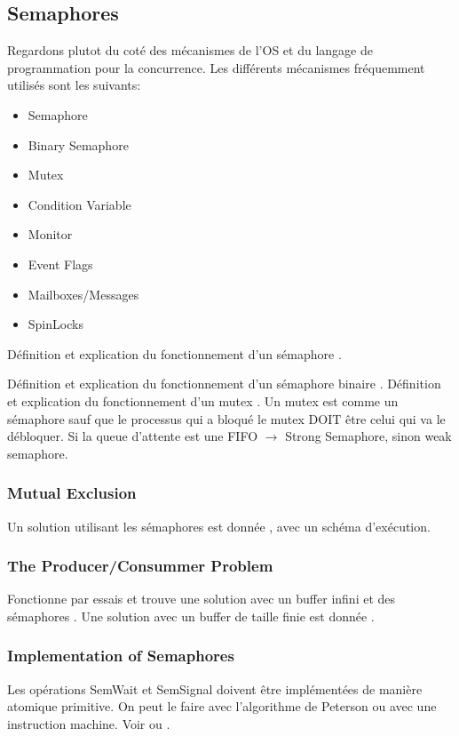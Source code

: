\subsection{Semaphores}
Regardons plutot du coté des mécanismes de l'OS et du langage de programmation pour la concurrence.
Les différents mécanismes fréquemment utilisés sont les suivants:
\begin{itemize}
  \item Semaphore
  \item Binary Semaphore
  \item Mutex
  \item Condition Variable
  \item Monitor
  \item Event Flags
  \item Mailboxes/Messages
  \item SpinLocks
\end{itemize}
Définition et explication du fonctionnement d'un sémaphore \cite[p.~235]{stallings}.

Définition et explication du fonctionnement d'un sémaphore binaire \cite[p.~236]{stallings}.
Définition et explication du fonctionnement d'un mutex \cite[p.~236]{stallings}.
Un mutex est comme un sémaphore sauf que le processus qui a bloqué le mutex DOIT être celui qui va le débloquer.
Si la queue d'attente est une FIFO $\to$ Strong Semaphore, sinon weak semaphore.

\subsubsection{Mutual Exclusion}
Un solution utilisant les sémaphores est donnée \cite[p.~239]{stallings}, avec un schéma d'exécution.

\subsubsection{The Producer/Consummer Problem}
Fonctionne par essais et trouve une solution avec un buffer infini et des sémaphores \cite[p.~241]{stallings}.
Une solution avec un buffer de taille finie est donnée \cite[p.~243]{stallings}.

\subsubsection{Implementation of Semaphores}
Les opérations SemWait et SemSignal doivent être implémentées de manière atomique primitive.
On peut le faire avec l'algorithme de Peterson ou avec une instruction machine.
Voir \cite[p.~245]{stallings} ou \cite[Appendix~A]{stallings}.

